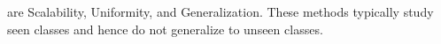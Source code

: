 \documentclass[runningheads]{llncs}
\begin{document}
are  Scalability, Uniformity, and Generalization.  These methods typically study seen classes and hence do not generalize to unseen classes.%
\end{document}
